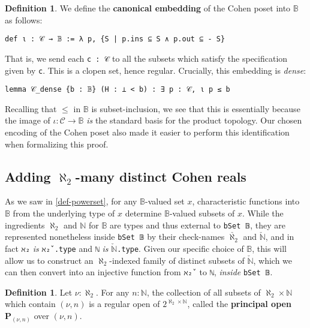 \documentclass[a4paper,USenglish,cleveref, autoref]{lipics-v2019}
\newcommand{\B}{\mathbb{B}}
\newcommand{\lil}{\lstinline}
\newcommand{\N}{\mathbb{N}}
\theoremstyle{theorem}
\theoremstyle{definition}
\newtheorem{defn}[definition]{Definition}
\begin{document}
\begin{defn}
  We define the \textbf{canonical embedding} of the Cohen poset into $\B$ as follows:
  \begin{lstlisting}
def ι : 𝒞 → 𝔹 := λ p, {S | p.ins ⊆ S ∧ p.out ⊆ - S}
\end{lstlisting}
\end{defn}
That is, we send each \lil{c : 𝒞} to all the subsets which satisfy the specification given by \lil{c}. This is a clopen set, hence regular. Crucially, this embedding is \emph{dense}:
\begin{lstlisting}
lemma 𝒞_dense {b : 𝔹} (H : ⊥ < b) : ∃ p : 𝒞, ι p ≤ b
\end{lstlisting}
Recalling that $\leq$ in $\B$ is subset-inclusion, we see that this is essentially because the image of $\iota : \mathcal{C} \to \B$ \emph{is} the standard basis for the product topology. Our chosen encoding of the Cohen poset also made it easier to perform this identification when formalizing this proof.
\subsection{Adding $\aleph_2$-many distinct Cohen reals} \label{subsect:cohen-reals}
As we saw in \autoref{def-powerset}, for any $\B$-valued set $x$, characteristic functions into $\B$ from the underlying type of $x$ determine $\B$-valued subsets of $x$. While the ingredients $\aleph_2$ and $\mathbb{N}$ for $\B$ are types and thus external to \lil{bSet 𝔹}, they are represented nonetheless inside \lil{bSet 𝔹} by their check-names $\check{\aleph_2}$ and $\check{\mathbb{N}}$, and in fact \lil{ℵ₂} \emph{is} \lil{ℵ₂̌ .type} and \lil{ℕ} \emph{is} $\check{\mathbb{N}}$\lil{.type}. Given our specific choice of $\B$, this will allow us to construct an $\aleph_2$-indexed family of distinct subsets of $\check{\N}$, which we can then convert into an injective function from \lil{ℵ₂̌ } to \lil{ℕ}, \emph{inside} \lil{bSet 𝔹}.

\begin{defn}
  Let $\nu : \aleph_2$. For any $n : \N$, the collection of all subsets of $\aleph_2 \times \N$ which contain $(\nu, n)$ is a regular open of $2^{\aleph_2 \times \N}$, called the \textbf{principal open} $\mathbf{P}_{(\nu, n)}$ over $(\nu, n)$.
\end{defn}
\end{document}
